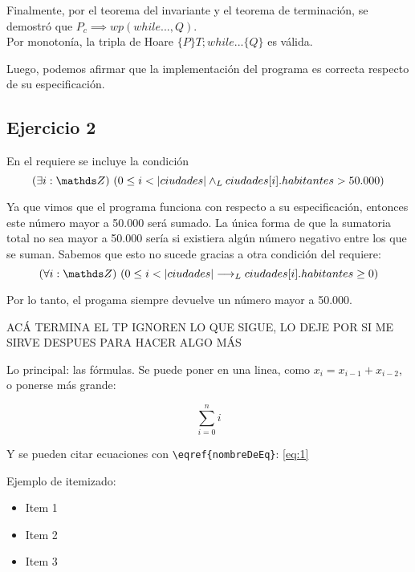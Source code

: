 \documentclass[10pt,a4paper]{article}
\begin{document}
	Finalmente, por el teorema del invariante y el teorema de terminaci\'on, se demostr\'o que $P_{c} \implies wp(while..., Q)$.\\

	Por monoton\'ia, la tripla de Hoare $\{P\}T;while...\{Q\}$ es v\'alida.

	Luego, podemos afirmar que la implementaci\'on del programa es correcta respecto de su especificaci\'on.
	
\subsection{Ejercicio 2}
En el requiere se incluye la condici\'on
	\begin{equation}
		\existe[unalinea]{i}{\ent}{0 \le i < |ciudades| \yLuego ciudades[i].habitantes > 50.000}
	\end{equation}

	Ya que vimos que el programa funciona con respecto a su especificaci\'on, entonces este n\'umero mayor a 50.000 ser\'a sumado. 
	La \'unica forma de que la sumatoria total no sea mayor a 50.000 ser\'ia si existiera alg\'un n\'umero negativo entre los que se suman.
	Sabemos que esto no sucede gracias a otra condici\'on del requiere: 
	\begin{equation}
		\paraTodo[unalinea]{i}{\ent}{0 \le i < |ciudades| \implicaLuego ciudades[i].habitantes \ge 0}
	\end{equation}

Por lo tanto, el progama siempre devuelve un n\'umero mayor a 50.000.

\vspace{4cm}
	ACÁ TERMINA EL TP IGNOREN LO QUE SIGUE, LO DEJE POR SI ME SIRVE DESPUES PARA HACER ALGO MÁS 
	
	\vspace{4cm}

Lo principal: las fórmulas. Se puede poner en una linea, como $x_i = x_{i-1} + x_{i-2}$, o ponerse más grande:

\begin{equation}
	\sum\limits_{i=0}^{n} i
	\label{eq:1}
\end{equation}

Y se pueden citar ecuaciones con \verb|\eqref{nombreDeEq}|: \eqref{eq:1}

Ejemplo de itemizado:

\begin{itemize}
	\item Item 1
	\item Item 2
	\item Item 3
\end{itemize}
\end{document}
